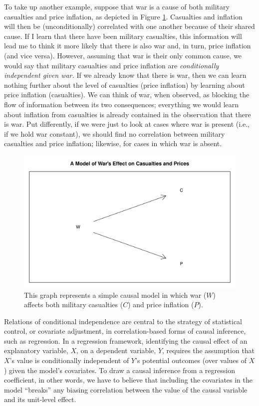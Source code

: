 \documentclass[12pt,]{book}
\begin{document}
To take up another example, suppose that war is a cause of both military casualties and price inflation, as depicted in Figure \ref{fig:warDAG}. Casualties and inflation will then be (unconditionally) correlated with one another because of their shared cause. If I learn that there have been military casualties, this information will lead me to think it more likely that there is also war and, in turn, price inflation (and vice versa). However, assuming that war is their only common cause, we would say that military casualties and price inflation are \emph{conditionally independent given war.} If we already know that there is war, then we can learn nothing further about the level of casualties (price inflation) by learning about price inflation (casualties). We can think of war, when observed, as blocking the flow of information between its two consequences; everything we would learn about inflation from casualties is already contained in the observation that there is war. Put differently, if we were just to look at cases where war is present (i.e., if we hold war constant), we should find no correlation between military casualties and price inflation; likewise, for cases in which war is absent.

\begin{figure}

{\centering \includegraphics[width=.5\textwidth]{ii_files/figure-latex/warDAG-1} 

}

\caption{This graph represents a simple causal model in which war ($W$) affects both military casualties ($C$) and price inflation ($P$).}\label{fig:warDAG}
\end{figure}

Relations of conditional independence are central to the strategy of statistical control, or covariate adjustment, in correlation-based forms of causal inference, such as regression. In a regression framework, identifying the causal effect of an explanatory variable, \(X\), on a dependent variable, \(Y\), requires the assumption that \(X\)'s value is conditionally independent of \(Y\)'s potential outcomes (over values of \(X\)) given the model's covariates. To draw a causal inference from a regression coefficient, in other words, we have to believe that including the covariates in the model ``breaks'' any biasing correlation between the value of the causal variable and its unit-level effect.
\end{document}
